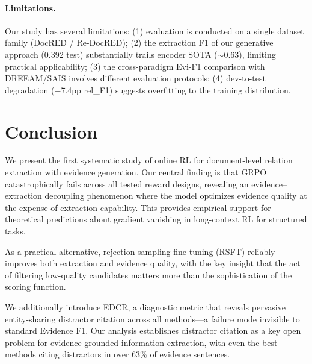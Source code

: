 \documentclass[11pt,a4paper]{article}
\begin{document}
\paragraph{Limitations.}
Our study has several limitations: (1) evaluation is conducted on a single dataset family (DocRED / Re-DocRED); (2) the extraction F1 of our generative approach (0.392 test) substantially trails encoder SOTA ($\sim$0.63), limiting practical applicability; (3) the cross-paradigm Evi-F1 comparison with DREEAM/SAIS involves different evaluation protocols; (4) dev-to-test degradation ($-$7.4pp rel\_F1) suggests overfitting to the training distribution.

\section{Conclusion}
\label{sec:conclusion}

We present the first systematic study of online RL for document-level relation extraction with evidence generation.
Our central finding is that GRPO catastrophically fails across all tested reward designs, revealing an evidence--extraction decoupling phenomenon where the model optimizes evidence quality at the expense of extraction capability.
This provides empirical support for theoretical predictions about gradient vanishing in long-context RL for structured tasks.

As a practical alternative, rejection sampling fine-tuning (RSFT) reliably improves both extraction and evidence quality, with the key insight that the act of filtering low-quality candidates matters more than the sophistication of the scoring function.

We additionally introduce EDCR, a diagnostic metric that reveals pervasive entity-sharing distractor citation across all methods---a failure mode invisible to standard Evidence F1.
Our analysis establishes distractor citation as a key open problem for evidence-grounded information extraction, with even the best methods citing distractors in over 63\% of evidence sentences.



\end{document}
